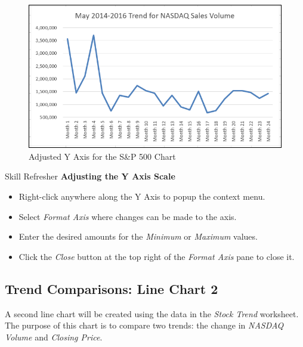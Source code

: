 \begin{figure}[H]
	\centering
	\includegraphics[width=\maxwidth{.95\linewidth}]{gfx/ch04_fig06}
	\caption{Adjusted Y Axis for the S\&P 500 Chart}
	\label{04:fig06}
\end{figure}

\begin{center}
	\begin{sklbox}{Skill Refresher}
		\textbf{Adjusting the Y Axis Scale}
		\\
		\begin{itemize}
			\setlength{\itemsep}{0pt}
			\setlength{\parskip}{0pt}
			\setlength{\parsep}{0pt}

			\item Right-click anywhere along the Y Axis to popup the context menu.
			\item Select \textit{Format Axis} where changes can be made to the axis.
			\item Enter the desired amounts for the \textit{Minimum} or \textit{Maximum} values.
			\item Click the \textit{Close} button at the top right of the \textit{Format Axis} pane to close it.
			
		\end{itemize}
	\end{sklbox}
\end{center}

\subsection{Trend Comparisons: Line Chart 2}

A second line chart will be created using the data in the \textit{Stock Trend} worksheet. The purpose of this chart is to compare two trends: the change in \textit{NASDAQ Volume} and \textit{Closing Price}.

